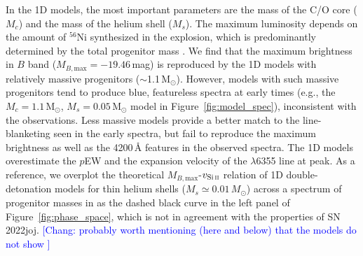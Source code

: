\documentclass[twocolumn]{aastex631}
\newcommand{\sn}{SN\,2022joj}
\newcommand{\chang}[1]{\textcolor{blue}{[Chang: #1]}}
\begin{document}
\begin{CJK*}{UTF8}{gbsn}
In the 1D models, the most important parameters are the mass of the C/O core ($M_c$) and the mass of the helium shell ($M_s$). The maximum luminosity depends on the amount of $^{56}$Ni synthesized in the explosion, which is predominantly determined by the total progenitor mass \citep[$M_c+M_s$;][]{polin_observational_2019}. We find that the maximum brightness in $B$ band ($M_{B,\mathrm{max}}=-19.46$\,mag) is reproduced by the 1D models with relatively massive progenitors ($\sim$1.1\,$\mathrm{M_\odot}$). However, models with such massive progenitors tend to produce blue, featureless spectra at early times (e.g., the $M_c=1.1\,\mathrm{M_\odot}$, $M_s=0.05\,\mathrm{M_\odot}$ model in Figure~\ref{fig:model_spec}), inconsistent with the observations. Less massive models provide a better match to the line-blanketing seen in the early spectra, but fail to reproduce the maximum brightness as well as the 4200\,\r{A} features in the observed spectra. The 1D models overestimate the $p$EW and the expansion velocity of the  $\lambda$6355 line at peak. As a reference, we overplot the theoretical $M_{B,\mathrm{max}}$-$v_\mathrm{Si\,\textsc{ii}}$ relation of 1D double-detonation models for thin helium shells ($M_s \simeq 0.01\,M_\odot$) across a spectrum of progenitor masses in \citet{polin_observational_2019} as the dashed black curve in the left panel of Figure~\ref{fig:phase_space}, which is not in agreement with the properties of \sn. \chang{probably worth mentioning (here and below) that the models do not show \ion{C}{2}}


\end{CJK*}
\end{document}
